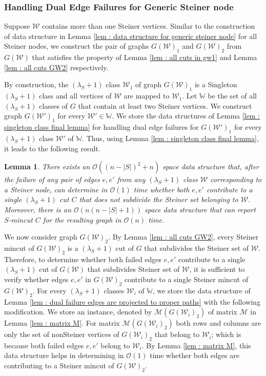 \documentclass[letterpaper,11pt]{article}
\newtheorem{lemma}{Lemma}[]
\begin{document}
\subsubsection{Handling Dual Edge Failures for Generic Steiner node}
Suppose ${\mathcal W}$ contains more than one Steiner vertices. Similar to the construction of data structure in Lemma \ref{lem : data structure for generic steiner node} for all Steiner nodes, we construct the pair of graphs $G({\mathcal W})_1$ and $G({\mathcal W})_2$ from $G({\mathcal W})$ that satisfies the property of Lemma \ref{lem : all cuts in gw1} and Lemma \ref{lem : all cuts GW2} respectively. 

By construction, the $(\lambda_S+1)$ class ${\mathcal W}_1$ of graph $G({\mathcal W})_1$ is a Singleton $(\lambda_S+1)$ class and all vertices of ${\mathcal W}$ are mapped to ${\mathcal W}_1$. Let ${\mathbb W}$ be the set of all $(\lambda_S+1)$ classes of $G$ that contain at least two Steiner vertices. We construct graph $G({\mathcal W}')_1$ for every ${\mathcal W}'\in {\mathbb W}$. We store the data structures of Lemma \ref{lem : singleton class final lemma} for handling dual edge failures for $G({\mathcal W}')_1$ for every $(\lambda_S+1)$ class ${\mathcal W}'$ of ${\mathbb W}$. Thus, using Lemma \ref{lem : singleton class final lemma}, it leads to the following result.
\begin{lemma} \label{lem : dual failure and does not subdivide steiner set}
     There exists an ${\mathcal O}((n-|S|)^2+n)$ space data structure that, after the failure of any pair of edges $e,e'$ from any $(\lambda_S+1)$ class ${\mathcal W}$ corresponding to a Steiner node, can determine in ${\mathcal O}(1)$ time whether both $e,e'$ contribute to a single $(\lambda_S+1)$ cut $C$ that does not subdivide the Steiner set belonging to ${\mathcal W}$. Moreover, there is an ${\mathcal O}(n(n-|S|+1))$ space data structure that can report $S$-mincut $C$ for the resulting graph in ${\mathcal O}(n)$ time. 
\end{lemma}
We now consider graph $G({\mathcal W})_2$. By Lemma \ref{lem : all cuts GW2}, every Steiner mincut of $G({\mathcal W})_2$ is a $(\lambda_S+1)$ cut of $G$ that subdivides the Steiner set of ${\mathcal W}$. Therefore, to determine whether both failed edges $e,e'$ contribute to a single $(\lambda_S+1)$ cut of $G({\mathcal W})$ that subdivides Steiner set of ${\mathcal W}$, it is sufficient to verify whether edges $e,e'$ in $G({\mathcal W})_2$ contribute to a single Steiner mincut of $G({\mathcal W})_2$. 
For every $(\lambda_S+1)$ classes ${\mathcal W}_i$ of ${\mathbb W}$, we store the data structure of Lemma \ref{lem : dual failure edges are projected to proper paths} with the following modification. We store an instance, denoted by ${\mathcal M}(G({\mathcal W}_i)_2)$ of matrix ${\mathcal M}$ in Lemma \ref{lem : matrix M}. For matrix ${\mathcal M}({G({\mathcal W}_i)_2})$ both rows and columns are only the set of nonSteiner vertices of $G({\mathcal W}_i)_2$ that belong to ${\mathcal W}_i$; which is because both failed edges $e,e'$ belong to ${\mathcal W}_i$. By Lemma \ref{lem : matrix M}, this data structure helps in determining in ${\mathcal O}(1)$ time whether both edges are contributing to a Steiner mincut of $G({\mathcal W})_2$.
\end{document}
